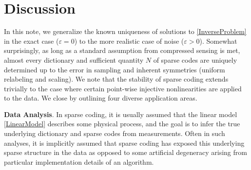 \documentclass[journal, twocolumn]{IEEEtran}
\begin{document}



\section{Discussion}\label{Discussion}

In this note, we generalize the known uniqueness of solutions to \eqref{InverseProblem} in the exact case ($\varepsilon = 0$) to the more realistic case of noise ($\varepsilon > 0$).  Somewhat surprisingly, as long as a standard assumption from compressed sensing is met, almost every dictionary and sufficient quantity $N$ of sparse codes are uniquely determined up to the error in sampling and inherent symmetries (uniform relabeling and scaling). We note that the stability of sparse coding extends trivially to the case where certain point-wise injective nonlinearities are applied to the data. We close by outlining  four diverse application areas.


\textbf{Data Analysis}.  
In sparse coding, it is usually assumed that the linear model \eqref{LinearModel} describes some physical process, and the goal is to infer the true underlying dictionary and sparse codes from measurements. Often in such analyses, it is implicitly assumed that sparse coding has exposed this underlying sparse structure in the data as opposed to some artificial degeneracy arising from particular implementation details of an algorithm. 
\end{document}
